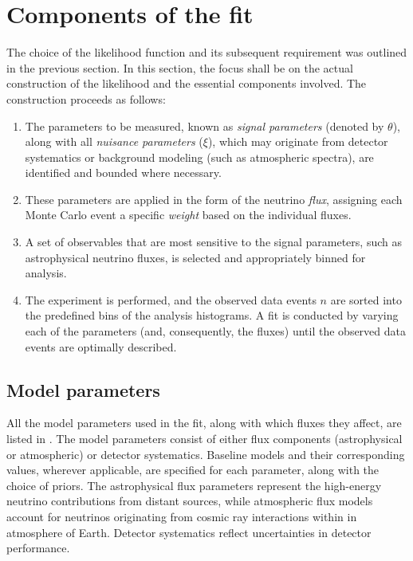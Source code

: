 \section{Components of the fit}
\label{sec:components}
The choice of the likelihood function and its subsequent requirement  was outlined in the previous section. In this section, the focus shall be on the actual construction of the likelihood and the essential components involved. The construction proceeds as follows:

\begin{enumerate}
    \item The parameters to be measured, known as \emph{signal parameters} (denoted by $\theta$), along with all \emph{nuisance parameters} ($\xi$), which may originate from detector systematics or background modeling (such as atmospheric spectra), are identified and bounded where necessary.
   
    \item These parameters are applied in the form of the neutrino \emph{flux}, assigning each Monte Carlo event a specific \emph{weight} based on the individual fluxes.

    \item A set of observables that are most sensitive to the signal parameters, such as astrophysical neutrino fluxes, is selected and appropriately binned for analysis.
    \item The experiment is performed, and the observed data events $n$ are sorted into the predefined bins of the analysis histograms. A fit is conducted by varying each of the parameters (and, consequently, the fluxes) until the observed data events are optimally described. 
\end{enumerate}


\subsection{Model parameters}
\label{sec:params}
All the model parameters used in the fit, along with which fluxes they affect, are listed in . The model parameters consist of either flux components (astrophysical or atmospheric) or detector systematics. Baseline models and their corresponding values, wherever applicable, are specified for each parameter, along with the choice of priors. The astrophysical flux parameters represent the high-energy neutrino contributions from distant sources, while atmospheric flux models account for neutrinos originating from cosmic ray interactions within in atmosphere of Earth. Detector systematics reflect uncertainties in detector performance. 

